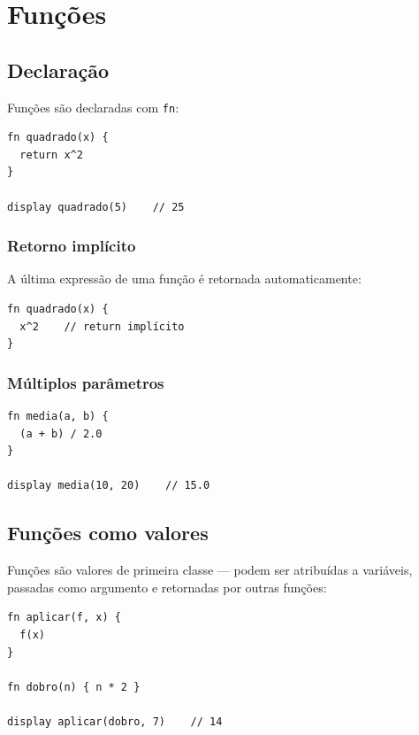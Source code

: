 \chapter{Funções}

\section{Declaração}

Funções são declaradas com \lstinline{fn}:

\begin{lstlisting}[caption={Função básica}]
fn quadrado(x) {
  return x^2
}

display quadrado(5)    // 25
\end{lstlisting}

\subsection*{Retorno implícito}

A última expressão de uma função é retornada automaticamente:

\begin{lstlisting}
fn quadrado(x) {
  x^2    // return implícito
}
\end{lstlisting}

\subsection*{Múltiplos parâmetros}

\begin{lstlisting}
fn media(a, b) {
  (a + b) / 2.0
}

display media(10, 20)    // 15.0
\end{lstlisting}

\section{Funções como valores}

Funções são valores de primeira classe — podem ser atribuídas a variáveis, passadas
como argumento e retornadas por outras funções:

\begin{lstlisting}[caption={Função como argumento}]
fn aplicar(f, x) {
  f(x)
}

fn dobro(n) { n * 2 }

display aplicar(dobro, 7)    // 14
\end{lstlisting}

